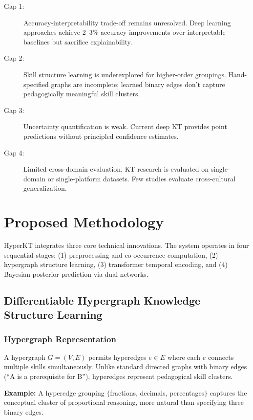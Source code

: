 \documentclass[10pt,twocolumn]{article}
\begin{document}
\begin{description}
  \item[Gap 1:] Accuracy-interpretability trade-off remains unresolved. Deep learning approaches achieve 2--3\% accuracy improvements over interpretable baselines but sacrifice explainability.
  
  \item[Gap 2:] Skill structure learning is underexplored for higher-order groupings. Hand-specified graphs are incomplete; learned binary edges don't capture pedagogically meaningful skill clusters.
  
  \item[Gap 3:] Uncertainty quantification is weak. Current deep KT provides point predictions without principled confidence estimates.
  
  \item[Gap 4:] Limited cross-domain evaluation. KT research is evaluated on single-domain or single-platform datasets. Few studies evaluate cross-cultural generalization.
\end{description}

\section{Proposed Methodology}

HyperKT integrates three core technical innovations. The system operates in four sequential stages: (1) preprocessing and co-occurrence computation, (2) hypergraph structure learning, (3) transformer temporal encoding, and (4) Bayesian posterior prediction via dual networks.

\subsection{Differentiable Hypergraph Knowledge Structure Learning}

\subsubsection{Hypergraph Representation}
A hypergraph $G = (V, E)$ permits hyperedges $e \in E$ where each $e$ connects multiple skills simultaneously. Unlike standard directed graphs with binary edges (``A is a prerequisite for B''), hyperedges represent pedagogical skill clusters.

\textbf{Example:} A hyperedge grouping $\{$fractions, decimals, percentages$\}$ captures the conceptual cluster of proportional reasoning, more natural than specifying three binary edges.
\end{document}
